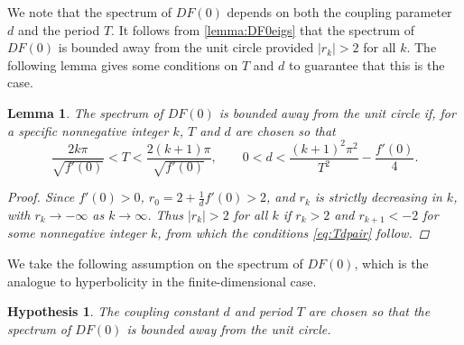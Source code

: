 \documentclass[12pt,reqno]{amsart}
\newtheorem{lemma}{Lemma}
\newtheorem{hypothesis}{Hypothesis}
\theoremstyle{definition}
\begin{document}
We note that the spectrum of $DF(0)$ depends on both the coupling parameter $d$ and the period $T$. It follows from \cref{lemma:DF0eigs} that the spectrum of $DF(0)$ is bounded away from the unit circle provided $|r_k| > 2$ for all $k$. The following lemma gives some conditions on $T$ and $d$ to guarantee that this is the case.

\begin{lemma}\label{lemma:DF0hyp}
The spectrum of $DF(0)$ is bounded away from the unit circle if, for a specific nonnegative integer $k$, $T$ and $d$ are chosen so that
\begin{equation}\label{eq:Tdpair}
\frac{2 k \pi}{\sqrt{f'(0)}} < T < \frac{2 (k+1) \pi}{\sqrt{f'(0)}} , \qquad 0 < d < \frac{(k+1)^2\pi^2}{T^2} - \frac{f'(0)}{4}.
\end{equation}
\begin{proof}
Since $f'(0) > 0$, $r_0 = 2 + \frac{1}{d}f'(0) > 2$, and $r_k$ is strictly decreasing in $k$, with $r_k \rightarrow -\infty$ as $k \rightarrow \infty$. Thus $|r_k| > 2$ for all $k$ if $r_k > 2$ and $r_{k+1} < -2$ for some nonnegative integer $k$, from which the conditions \cref{eq:Tdpair} follow.
\end{proof}
\end{lemma}

We take the following assumption on the spectrum of $DF(0)$, which is the analogue to hyperbolicity in the finite-dimensional case.

\begin{hypothesis}\label{hyp:hyp}
The coupling constant $d$ and period $T$ are chosen so that the spectrum of $DF(0)$ is bounded away from the unit circle.
\end{hypothesis}
\end{document}

